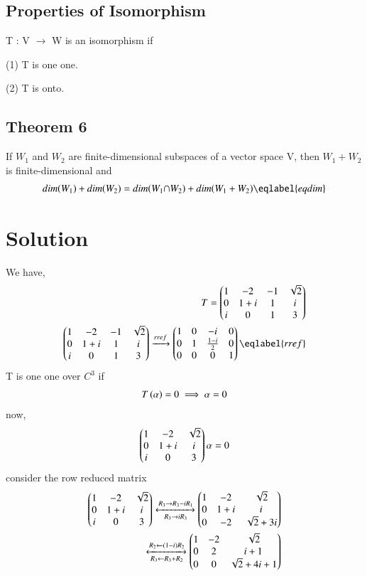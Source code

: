 \documentclass[journal,12pt,twocolumn]{IEEEtran}
\begin{document}
\subsection{Properties of Isomorphism}
T : V $\rightarrow$ W is an isomorphism if
 
 (1) T is one one.
 
 (2) T is onto.
 \subsection{Theorem 6} 
If $W_1$ and $W_2$ are finite-dimensional subspaces of a vector space V, then $W_1+W_2$ is finite-dimensional and
\begin{align}
    dim (W_1)+ dim(W_2) = dim(W_1 {\displaystyle \cap } W_2) + dim (W_1 + W_2)\eqlabel{eqdim}
\end{align}
\section{Solution}
We have,
\begin{align}
T=\myvec{1&-2&-1&\sqrt{2}\\0&1+i&1&i\\i&0&1&3}&\\
\myvec{1&-2&-1&\sqrt{2}\\0&1+i&1&i\\i&0&1&3}\xrightarrow[]{rref}\myvec{1&0&-i&0\\0&1&\frac{1-i}{2}&0\\0&0&0&1}\eqlabel{rref}
\end{align}
T is one one over $C^{3}$ if 
\begin{align}
    T\left(\alpha\right)=0 \implies \alpha =0
\end{align}
now,
\begin{align}
 \begin{pmatrix}1&-2&\sqrt{2}\\0&1+i&i\\i&0&3\end{pmatrix}\alpha = 0
\end{align}
consider the row reduced matrix
\begin{align}
    \begin{pmatrix}1&-2&\sqrt{2}\\0&1+i&i\\i&0&3\end{pmatrix}
    \xleftrightarrow[R_3\rightarrow i R_3]{R_3\rightarrow R_3-iR_1}\begin{pmatrix}1&-2&\sqrt{2}\\0&1+i&i\\0&-2&\sqrt{2}+3i\end{pmatrix}\\
    \xleftrightarrow[R_3\leftarrow R_3+R_2]{R_2\leftarrow (1-i)R_2}\begin{pmatrix}1&-2&\sqrt{2}\\0&2&i+1\\0&0&\sqrt{2}+4i+1\end{pmatrix}
\end{align}
\end{document}
